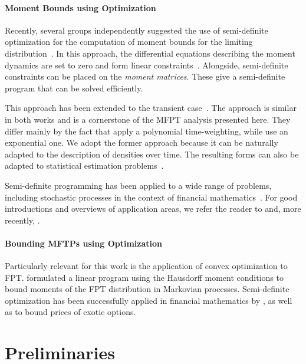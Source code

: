 \paragraph{Moment Bounds using Optimization} Recently, several groups independently suggested the use of semi-definite
optimization for the computation of moment bounds for the limiting
distribution~\parencite{ghusinga2017exact,dowdy2018bounds,kuntz2017rigorous,sakurai2017convex}.
In this approach, the differential equations describing the moment dynamics are
set to zero and form linear constraints~\parencite{backenkohler2018moment}. Alongside, semi-definite constraints can
be placed on the \emph{moment matrices}. These give a semi-definite program
that can be solved efficiently.

This approach has been extended to the transient
case~\parencite{dowdy2018dynamic,sakurai2019bounding}.
The approach is similar in both works and is a cornerstone of the \ac{MFPT} analysis
presented here.
They differ mainly by the fact that \citet{sakurai2019bounding} apply a polynomial
time-weighting, while \citet{dowdy2018dynamic} use an
exponential one. We adopt the former approach because it
can be naturally adapted to the description of densities over time.
The resulting forms can also be adapted to statistical estimation
problems~\parencite{backenkohler2019control}.

Semi-definite programming has been applied to a wide range of problems,
including stochastic processes in the context of financial
mathematics~\parencite{lasserre2006pricing,kashima2009polynomial}.
For good introductions and overviews of application areas, we refer
the reader to \citet{parrilo2003semidefinite} and, more recently,
\citet{lasserre2010moments}.

\paragraph{Bounding MFTPs using Optimization}
Particularly relevant for this work is the application of convex optimization to
\ac{FPT}\@.
\citet{helmes2001computing} formulated a linear program using the
Hausdorff moment conditions to bound moments of the
\ac{FPT} distribution in Markovian processes.
Semi-definite optimization has been successfully applied in financial
mathematics by \citet{kashima2009polynomial}, as well as
\citet{lasserre2006pricing} to bound prices of exotic options.

\section{Preliminaries}\label{sec:mfpt:bg}



